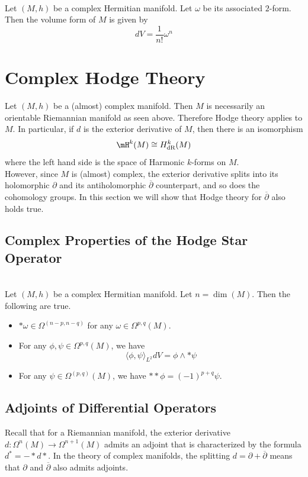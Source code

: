 \documentclass[a4paper]{article}
\begin{document}
\begin{prp}{}{}\\
Let $(M,h)$ be a complex Hermitian manifold. Let $\omega$ be its associated $2$-form. Then the volume form of $M$ is given by $$dV=\frac{1}{n!}\omega^n$$
\end{prp}

\pagebreak
\section{Complex Hodge Theory}
Let $(M,h)$ be a (almost) complex manifold. Then $M$ is necessarily an orientable Riemannian manifold as seen above. Therefore Hodge theory applies to $M$. In particular, if $d$ is the exterior derivative of $M$, then there is an isomorphism $$\mH^k(M)\cong H_\text{dR}^k(M)$$ where the left hand side is the space of Harmonic $k$-forms on $M$. \\

However, since $M$ is (almost) complex, the exterior derivative splits into its holomorphic $\partial$ and its antiholomorphic $\overline{\partial}$ counterpart, and so does the cohomology groups. In this section we will show that Hodge theory for $\overline{\partial}$ also holds true. 

\subsection{Complex Properties of the Hodge Star Operator}
\begin{prp}{}{}\\
Let $(M,h)$ be a complex Hermitian manifold. Let $n=\dim(M)$. Then the following are true. 
\begin{itemize}
\item $\ast\omega\in\Omega^{(n-p,n-q)}$ for any $\omega\in\Omega^{p,q}(M)$. 
\item For any $\phi,\psi\in\Omega^{p,q}(M)$, we have $$\langle\phi,\psi\rangle_{L^2}dV=\phi\wedge\ast\psi$$
\item For any $\psi\in\Omega^{(p,q)}(M)$, we have $\ast\ast\phi=(-1)^{p+q}\psi$. 
\end{itemize}
\end{prp}

\subsection{Adjoints of Differential Operators}
Recall that for a Riemannian manifold, the exterior derivative $d:\Omega^n(M)\to\Omega^{n+1}(M)$ admits an adjoint that is characterized by the formula $d^\ast=-\ast d\ast$. In the theory of complex manifolds, the splitting $d=\partial+\overline{\partial}$ means that $\partial$ and $\overline{\partial}$ also admits adjoints. 
\end{document}
